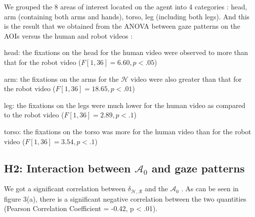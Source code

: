\documentclass[lettersize, noapacite, twoside, HRI]{apa_HRI}
\newcommand{\anti}{{$\mathcal{A}_0$ }}
\begin{document}
We grouped the 8 areas of interest located on the agent into 4 categories : {\sf
head}, {\sf arm} (containing both arms and hands), {\sf torso}, {\sf leg}
(including both legs). And this is the result that we obtained from the ANOVA
between gaze patterns on the AOIs versus the human and robot videos :

{\sf head}: the fixations on the head for the human video
were observed to more than that for the robot video ($F[1,36] = 6.60, p < .05$)

{\sf arm}: the fixations on the arms for the $\mathcal{H}$ video
were also greater than that for the robot video ($F[1,36] = 18.65, p < .01$)

{\sf leg}: the fixations on the legs were much lower
for the human video as compared to the robot video ($F[1,36] = 2.89, p < .1$)

{\sf torso}: the fixations on the torso was more for the
human video than for the robot video ($F[1,36] = 3.54, p < .1$) 

\subsection{H2: Interaction between \anti and gaze patterns}

We got a significant correlation between $\delta_{\mathcal{H},\mathcal{R}}$ and
the \anti. As can be seen in figure 3(a), there is a significant negative
correlation between the two quantities (Pearson Correlation Coefficient = -0.42,
p < .01).
\end{document}
